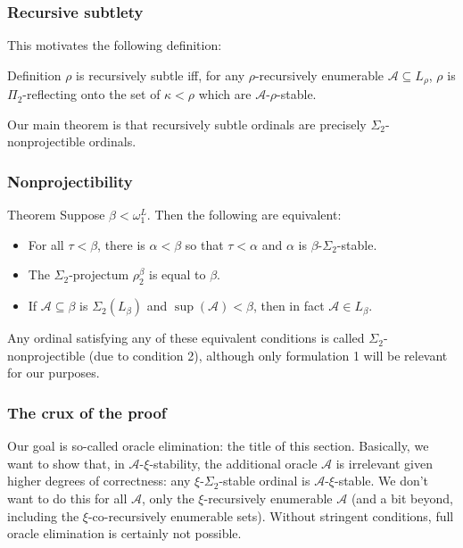 \documentclass{beamer}
\begin{document}
\begin{frame}
\frametitle{Recursive subtlety}
This motivates the following definition:

\begin{block}{Definition}
$\rho$ is recursively subtle iff, for any $\rho$-recursively enumerable $\mathcal{A} \subseteq L_\rho$, $\rho$ is $\Pi_2$-reflecting onto the set of $\kappa < \rho$ which are $\mathcal{A}$-$\rho$-stable.
\end{block}

Our main theorem is that recursively subtle ordinals are precisely $\Sigma_2$-nonprojectible ordinals.
\end{frame}

\begin{frame}
\frametitle{Nonprojectibility}
\begin{block}{Theorem}
Suppose $\beta < \omega_1^L$. Then the following are equivalent:

\begin{itemize}
    \item For all $\tau < \beta$, there is $\alpha < \beta$ so that $\tau < \alpha$ and $\alpha$ is $\beta$-$\Sigma_2$-stable.
    \item The $\Sigma_2$-projectum $\rho_2^\beta$ is equal to $\beta$.
    \item If $\mathcal{A} \subseteq \beta$ is $\Sigma_2(L_\beta)$ and $\sup(\mathcal{A}) < \beta$, then in fact $\mathcal{A} \in L_\beta$.
\end{itemize}
\end{block}

\pause

Any ordinal satisfying any of these equivalent conditions is called $\Sigma_2$-nonprojectible (due to condition 2), although only formulation 1 will be relevant for our purposes.
\end{frame}

\begin{frame}
\frametitle{The crux of the proof}
Our goal is so-called oracle elimination: the title of this section. Basically, we want to show that, in $\mathcal{A}$-$\xi$-stability, the additional oracle $\mathcal{A}$ is irrelevant given higher degrees of correctness: any $\xi$-$\Sigma_2$-stable ordinal is $\mathcal{A}$-$\xi$-stable. \pause We don't want to do this for all $\mathcal{A}$, only the $\xi$-recursively enumerable $\mathcal{A}$ (and a bit beyond, including the $\xi$-co-recursively enumerable sets). Without stringent conditions, full oracle elimination is certainly not possible.
\end{frame}
\end{document}
